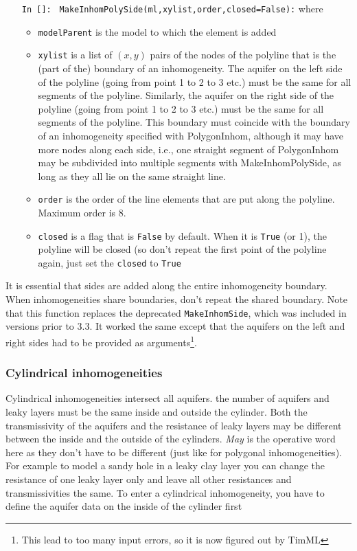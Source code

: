 \documentclass [10pt,letterpaper] {article}
\begin{document}
\begin{itemize}
\item[{\tt In []:}] {\tt
MakeInhomPolySide(ml,xylist,order,closed=False):} where
    \begin{itemize}
    \item {\tt modelParent} is the model to which the element is
    added
    \item {\tt xylist} is a list of $(x,y)$ pairs of the nodes of
    the polyline that is the (part of the) boundary of an inhomogeneity. 
    The aquifer on the left side of the polyline (going from point 1 to 2 to 3 etc.) must
    be the same for all segments of the polyline. Similarly, the aquifer on the right side of the polyline (going from point 1 to 2 to 3 etc.) must
    be the same for all segments of the polyline.
    This boundary must coincide with the boundary of
    an inhomogeneity specified with PolygonInhom, although it may have more nodes along each
    side, i.e., one straight segment of PolygonInhom may be subdivided into
    multiple segments with MakeInhomPolySide, as long as they all lie on the same
    straight line.
    \item {\tt order} is the order of the line elements that are put along the
    polyline. Maximum order is 8.
    \item {\tt closed} is a flag that is {\tt False} by default. When it is
    {\tt True} (or 1), the polyline will be closed (so don't repeat the first
    point of the polyline again, just set the {\tt closed} to {\tt True}
    \end{itemize}
\end{itemize}
It is essential that sides are added along the entire inhomogeneity boundary. When inhomogeneities share boundaries, don't repeat the shared
boundary.
Note that this function replaces the deprecated \texttt{MakeInhomSide}, which was included in versions prior to 3.3. It  worked the same
except that the aquifers on the left and right sides had to be provided as arguments\footnote{This lead to too many input errors, so it is
now figured out by TimML}.

\subsubsection{Cylindrical inhomogeneities}
Cylindrical inhomogeneities intersect all aquifers. the number of aquifers and leaky layers
must be the same inside and outside the cylinder. Both the transmissivity of the aquifers and the resistance of leaky
layers may be different between the inside and the outside of the cylinders.  \emph{May} is the operative word here as they
don't have to be different (just like for polygonal inhomogeneities). For example to model a sandy hole in a leaky clay layer
you can change the resistance of one leaky layer only and leave all other resistances and transmissivities
the same. To enter a cylindrical inhomogeneity, you have to define the aquifer data
on the inside of the cylinder first
\end{document}
